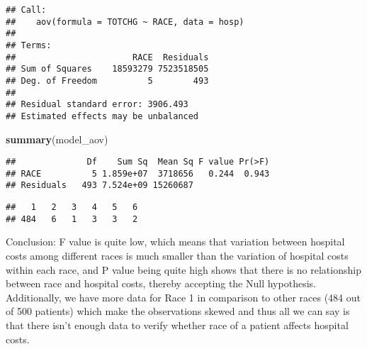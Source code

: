 \documentclass[
]{article}
\newenvironment{Shaded}{\begin{snugshade}}{\end{snugshade}}
\newcommand{\CommentTok}[1]{\textcolor[rgb]{0.56,0.35,0.01}{\textit{#1}}}
\newcommand{\DataTypeTok}[1]{\textcolor[rgb]{0.13,0.29,0.53}{#1}}
\newcommand{\KeywordTok}[1]{\textcolor[rgb]{0.13,0.29,0.53}{\textbf{#1}}}
\newcommand{\NormalTok}[1]{#1}
\newcommand{\OperatorTok}[1]{\textcolor[rgb]{0.81,0.36,0.00}{\textbf{#1}}}
\begin{document}
\begin{Shaded}
\end{Shaded}

\begin{verbatim}
## Call:
##    aov(formula = TOTCHG ~ RACE, data = hosp)
## 
## Terms:
##                       RACE  Residuals
## Sum of Squares    18593279 7523518505
## Deg. of Freedom          5        493
## 
## Residual standard error: 3906.493
## Estimated effects may be unbalanced
\end{verbatim}

\begin{Shaded}
\begin{Highlighting}[]
\KeywordTok{summary}\NormalTok{(model_aov) }
\end{Highlighting}
\end{Shaded}

\begin{verbatim}
##              Df    Sum Sq  Mean Sq F value Pr(>F)
## RACE          5 1.859e+07  3718656   0.244  0.943
## Residuals   493 7.524e+09 15260687
\end{verbatim}

\begin{Shaded}
\end{Shaded}

\begin{verbatim}
##   1   2   3   4   5   6 
## 484   6   1   3   3   2
\end{verbatim}

Conclusion: F value is quite low, which means that variation between
hospital costs among different races is much smaller than the variation
of hospital costs within each race, and P value being quite high shows
that there is no relationship between race and hospital costs, thereby
accepting the Null hypothesis. Additionally, we have more data for Race
1 in comparison to other races (484 out of 500 patients) which make the
observations skewed and thus all we can say is that there isn't enough
data to verify whether race of a patient affects hospital costs.
\end{document}
